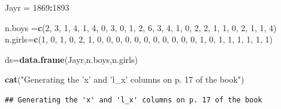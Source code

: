 \documentclass[]{book}
\newenvironment{Shaded}{\begin{snugshade}}{\end{snugshade}}
\newcommand{\DataTypeTok}[1]{\textcolor[rgb]{0.13,0.29,0.53}{#1}}
\newcommand{\DecValTok}[1]{\textcolor[rgb]{0.00,0.00,0.81}{#1}}
\newcommand{\KeywordTok}[1]{\textcolor[rgb]{0.13,0.29,0.53}{\textbf{#1}}}
\newcommand{\NormalTok}[1]{#1}
\newcommand{\OperatorTok}[1]{\textcolor[rgb]{0.81,0.36,0.00}{\textbf{#1}}}
\newcommand{\StringTok}[1]{\textcolor[rgb]{0.31,0.60,0.02}{#1}}
\begin{document}
\begin{Shaded}
\begin{Highlighting}[]
\NormalTok{Jayr =}\StringTok{ }\DecValTok{1869}\OperatorTok{:}\DecValTok{1893}

\NormalTok{n.boys =}\KeywordTok{c}\NormalTok{(}\DecValTok{2}\NormalTok{, }\DecValTok{3}\NormalTok{, }\DecValTok{1}\NormalTok{, }\DecValTok{4}\NormalTok{, }\DecValTok{1}\NormalTok{, }\DecValTok{4}\NormalTok{, }\DecValTok{0}\NormalTok{, }\DecValTok{3}\NormalTok{, }\DecValTok{0}\NormalTok{, }\DecValTok{1}\NormalTok{, }\DecValTok{2}\NormalTok{, }\DecValTok{6}\NormalTok{, }\DecValTok{3}\NormalTok{, }\DecValTok{4}\NormalTok{, }\DecValTok{1}\NormalTok{, }\DecValTok{0}\NormalTok{, }\DecValTok{2}\NormalTok{, }\DecValTok{2}\NormalTok{, }\DecValTok{1}\NormalTok{, }\DecValTok{1}\NormalTok{, }\DecValTok{0}\NormalTok{, }\DecValTok{2}\NormalTok{, }\DecValTok{1}\NormalTok{, }\DecValTok{1}\NormalTok{, }\DecValTok{4}\NormalTok{)}
\NormalTok{n.girls=}\KeywordTok{c}\NormalTok{(}\DecValTok{1}\NormalTok{, }\DecValTok{0}\NormalTok{, }\DecValTok{1}\NormalTok{, }\DecValTok{0}\NormalTok{, }\DecValTok{2}\NormalTok{, }\DecValTok{1}\NormalTok{, }\DecValTok{0}\NormalTok{, }\DecValTok{0}\NormalTok{, }\DecValTok{0}\NormalTok{, }\DecValTok{0}\NormalTok{, }\DecValTok{0}\NormalTok{, }\DecValTok{0}\NormalTok{, }\DecValTok{0}\NormalTok{, }\DecValTok{0}\NormalTok{, }\DecValTok{0}\NormalTok{, }\DecValTok{0}\NormalTok{, }\DecValTok{0}\NormalTok{, }\DecValTok{1}\NormalTok{, }\DecValTok{0}\NormalTok{, }\DecValTok{1}\NormalTok{, }\DecValTok{1}\NormalTok{, }\DecValTok{1}\NormalTok{, }\DecValTok{1}\NormalTok{, }\DecValTok{1}\NormalTok{, }\DecValTok{1}\NormalTok{)}

\NormalTok{ds=}\KeywordTok{data.frame}\NormalTok{(Jayr,n.boys,n.girls)}

\KeywordTok{cat}\NormalTok{(}\StringTok{"Generating the 'x' and 'l_x' columns on p. 17 of the book"}\NormalTok{)}
\end{Highlighting}
\end{Shaded}

\begin{verbatim}
## Generating the 'x' and 'l_x' columns on p. 17 of the book
\end{verbatim}

\begin{Shaded}
\end{Shaded}
\end{document}
